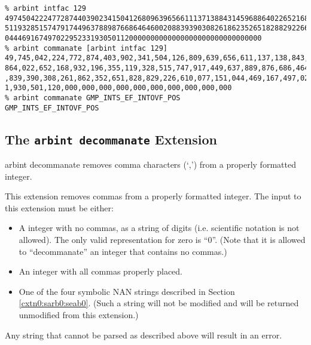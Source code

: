 \begin{tclcommandsampleinvocations}
\begin{scriptsize}
\begin{verbatim}
% arbint intfac 129
4974504222477287440390234150412680963965661113713884314596886402265216893219635
5119328515747917449637889876686464600208839390308261862352651828829226610077151
044469167497022952331930501120000000000000000000000000000000
% arbint commanate [arbint intfac 129]
49,745,042,224,772,874,403,902,341,504,126,809,639,656,611,137,138,843,145,968,
864,022,652,168,932,196,355,119,328,515,747,917,449,637,889,876,686,464,600,208
,839,390,308,261,862,352,651,828,829,226,610,077,151,044,469,167,497,022,952,33
1,930,501,120,000,000,000,000,000,000,000,000,000,000
% arbint commanate GMP_INTS_EF_INTOVF_POS
GMP_INTS_EF_INTOVF_POS
\end{verbatim}
\end{scriptsize}
\end{tclcommandsampleinvocations}


\subsection{The \texttt{arbint decommanate} Extension}
\label{cxtn0:sarb0:sdco0}

\begin{tclcommandname}{arbint decommanate}%
removes comma characters (`,') from a properly
formatted integer.
\end{tclcommandname}

\begin{tclcommandsynopsis}
\end{tclcommandsynopsis}

\begin{tclcommanddescription}
This extension removes commas from a properly formatted integer.
The input to this extension
must be either:

\begin{itemize}
\item A integer with no commas, as a string of digits (i.e. 
      scientific notation is not allowed).  The only valid representation
	  for zero is ``0''.  (Note that it is allowed to ``decommanate''
	  an integer that contains no commas.)
\item An integer with all commas properly placed.
\item One of the four symbolic NAN strings described in
      Section \ref{cxtn0:sarb0:seab0}.  (Such a string
	  will not be modified and will be returned unmodified from
	  this extension.)
\end{itemize}

Any string that cannot be parsed as described above will result in
an error.
\end{tclcommanddescription}

